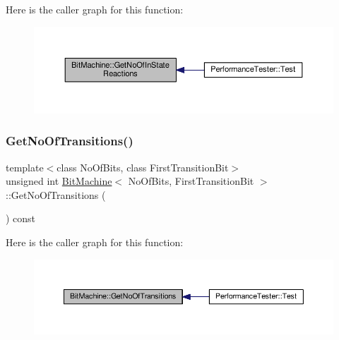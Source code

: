 Here is the caller graph for this function\+:
\nopagebreak
\begin{figure}[H]
\begin{center}
\leavevmode
\includegraphics[width=350pt]{struct_bit_machine_a7e488a02bcdc1984dd078aff1db33ce1_icgraph}
\end{center}
\end{figure}
\mbox{\label{struct_bit_machine_a1e02c163421c8981a86405ed8c83c9c0}} 
\subsubsection{\texorpdfstring{Get\+No\+Of\+Transitions()}{GetNoOfTransitions()}}
{\footnotesize\ttfamily template$<$class No\+Of\+Bits, class First\+Transition\+Bit$>$ \\
unsigned int \mbox{\hyperlink{struct_bit_machine}{Bit\+Machine}}$<$ No\+Of\+Bits, First\+Transition\+Bit $>$\+::Get\+No\+Of\+Transitions (\begin{DoxyParamCaption}{ }\end{DoxyParamCaption}) const\hspace{0.3cm}{\ttfamily [inline]}}

Here is the caller graph for this function\+:
\nopagebreak
\begin{figure}[H]
\begin{center}
\leavevmode
\includegraphics[width=350pt]{struct_bit_machine_a1e02c163421c8981a86405ed8c83c9c0_icgraph}
\end{center}
\end{figure}
\mbox{\label{struct_bit_machine_afca2097dd81c0e01f7a7bafc0cb7f97b}} 
